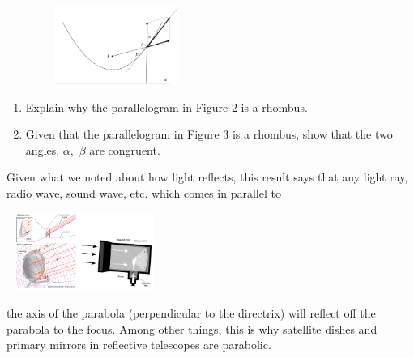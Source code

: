 \begin{embeddedproblem}{}
\begin{figure}
\captionsetup{labelformat=empty}
\centerline{\includegraphics*[height=1in,width=2in]{Figures/GeometricParabola3}}
\label{fig:}
\end{figure}
  \begin{enumerate}
  \item Explain why the parallelogram in Figure 2 is a rhombus.
  \item	Given that the parallelogram in Figure 3 is a rhombus, show
    that the two angles, $\alpha,$ $\beta$ are congruent.
  \end{enumerate}
\end{embeddedproblem}
Given what we noted about how light reflects, this result says that
any light ray, radio wave, sound wave, etc. which comes in parallel to\\
\centerline{\includegraphics*[height=1in,width=2in]{Figures/Telescopes}}
the axis of the parabola (perpendicular to the directrix) will reflect
off the parabola to the focus.  Among other things, this is why
satellite dishes and primary mirrors in reflective telescopes are
parabolic.


